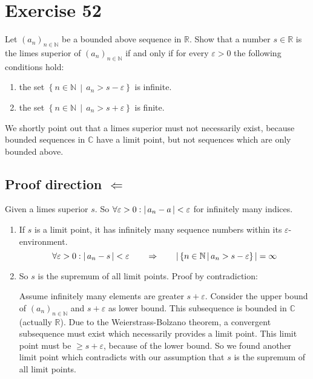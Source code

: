 \documentclass[a4paper]{article}
\theoremstyle{definition}
\newcommand\abs[1]{\left|\thinspace #1\thinspace\right|}
\newcommand\setdef[2]{\left\{#1\,\middle|\,#2\right\}}
\newcommand\card[1]{\left|\,#1\,\right|}
\newcommand\seq[1]{\left(#1\right)_{n\in\mathbb N}}
\begin{document}
\section{Exercise 52}
\begin{ex}
  Let $\seq{a_n}$ be a bounded above sequence in $\mathbb R$. Show that
  a number $s \in \mathbb R$ is the limes superior of $\seq{a_n}$ if and only if
  for every $\varepsilon > 0$ the following conditions hold:
  \begin{enumerate}
    \item the set $\setdef{n \in \mathbb N}{a_n > s - \varepsilon}$ is infinite.
    \item the set $\setdef{n \in \mathbb N}{a_n > s + \varepsilon}$ is finite.
  \end{enumerate}
\end{ex}

We shortly point out that a limes superior must not necessarily exist,
because bounded sequences in $\mathbb C$ have a limit point,
but not sequences which are only bounded above.

\subsection{Proof direction $\Leftarrow$}

Given a limes superior $s$. So $\forall \varepsilon > 0: \abs{a_n - a} < \varepsilon$
for infinitely many indices.

%
\begin{enumerate}
  \item If $s$ is a limit point, it has infinitely many sequence numbers within its $\varepsilon$-environment.
    \[
      \forall \varepsilon > 0: \abs{a_n - s} < \varepsilon
      \qquad\Rightarrow\qquad
      \card{\setdef{n \in \mathbb N}{a_n > s - \varepsilon}} = \infty
    \]
  \item
    So $s$ is the supremum of all limit points. Proof by contradiction:

    Assume infinitely many elements are greater $s + \varepsilon$.
    Consider the upper bound of $\seq{a_n}$ and $s+\varepsilon$ as lower bound.
    This subsequence is bounded in $\mathbb C$ (actually $\mathbb R$).
    Due to the Weierstrass-Bolzano theorem, a convergent subsequence must exist
    which necessarily provides a limit point. This limit point must be $\geq s + \varepsilon$,
    because of the lower bound. So we found another limit point which contradicts
    with our assumption that $s$ is the supremum of all limit points.
\end{enumerate}
\end{document}
